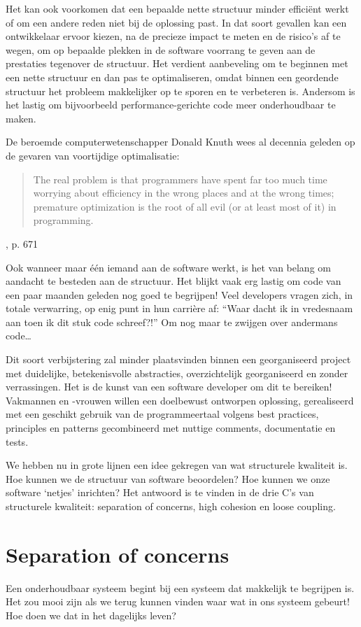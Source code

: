 Het kan ook voorkomen dat een bepaalde nette structuur
minder efficiënt werkt of om een andere reden niet bij de oplossing past. 
In dat soort gevallen kan een ontwikkelaar ervoor kiezen, 
na de precieze impact te meten en de risico's af te wegen, om
op bepaalde plekken in de software voorrang te geven aan de prestaties tegenover 
de structuur. Het verdient aanbeveling om te beginnen met een nette structuur
en dan pas te optimaliseren, omdat binnen een geordende structuur het probleem
makkelijker op te sporen en te verbeteren is. Andersom
is het lastig om bijvoorbeeld performance-gerichte code meer onderhoudbaar te maken.

De beroemde computerwetenschapper 
Donald Knuth wees al decennia geleden op de gevaren van
voortijdige optimalisatie:
\blockquote{
The real problem is that programmers have spent
far too much time worrying about efficiency in the
wrong places and at the wrong times; premature
optimization is the root of all evil (or at least most of it)
in programming.
}{\cite{Knuth1974}, p. 671}

Ook wanneer maar één iemand aan de software werkt, 
is het van belang om aandacht te besteden aan de structuur. 
Het blijkt vaak erg lastig om code van een paar maanden geleden
nog goed te begrijpen! 
Veel developers vragen zich,
in totale verwarring, op enig punt in hun carrière af:
``Waar dacht ik in vredesnaam aan toen ik dit stuk code schreef?!''
Om nog maar te zwijgen over andermans code\ldots

Dit soort verbijstering zal minder plaatsvinden binnen
een georganiseerd project met duidelijke, betekenisvolle
abstracties, overzichtelijk georganiseerd en zonder verrassingen. 
Het is de kunst van een software developer om dit te bereiken!
Vakmannen en -vrouwen willen een doelbewust ontworpen oplossing, gerealiseerd met 
een geschikt gebruik van de programmeertaal volgens best practices, 
principles en patterns gecombineerd met nuttige comments, documentatie en tests.

We hebben nu in grote lijnen een idee gekregen van wat
structurele kwaliteit is. Hoe kunnen we de structuur van software beoordelen?
Hoe kunnen we onze software `netjes' inrichten? Het antwoord is te vinden
in de drie C's van structurele kwaliteit: 
separation of concerns, high cohesion en loose coupling.

\section{Separation of concerns}
Een onderhoudbaar systeem begint bij een systeem dat 
makkelijk te begrijpen is. Het zou mooi zijn als we 
terug kunnen vinden waar wat in ons systeem gebeurt!
Hoe doen we dat in het dagelijks leven?

